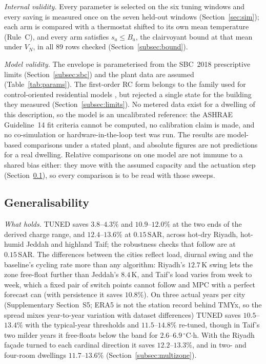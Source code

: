\documentclass[pdflatex,sn-mathphys-num,iicol]{sn-jnl}
\theoremstyle{thmstyleone}\newtheorem{proposition}{Proposition}\newtheorem{corollary}{Corollary}
\theoremstyle{thmstyletwo}\newtheorem{remark}{Remark}\newtheorem{observation}{Observation}
\theoremstyle{thmstylethree}\newtheorem{definition}{Definition}
\newcommand{\SAR}{\text{SAR}}
\begin{document}
\emph{Internal validity.} Every parameter is selected on the six tuning windows and every saving is measured once on the seven held-out windows (Section~\ref{sec:sim}); each arm is compared with a thermostat shifted to its own mean temperature (Rule~C), and every arm satisfies $s_a\le B_a$, the clairvoyant bound at that mean under $V_N$, in all $89$ rows checked (Section~\ref{subsec:bound}).

\emph{Model validity.} The envelope is parameterised from the SBC~2018 prescriptive limits (Section~\ref{subsec:sbc}) and the plant data are assumed (Table~\ref{tab:params}). The first-order RC form belongs to the family used for control-oriented residential models \citep{Wang2021RC,Shi2022}, but \citet{Bacher2011} rejected a single state for the building they measured (Section~\ref{subsec:limits}). No metered data exist for a dwelling of this description, so the model is an uncalibrated reference: the ASHRAE Guideline~14 fit criteria cannot be computed, no calibration claim is made, and no co-simulation or hardware-in-the-loop test was run. The results are model-based comparisons under a stated plant, and absolute figures are not predictions for a real dwelling. Relative comparisons on one model are not immune to a shared bias either: they move with the assumed capacity and the actuation step (Section~\ref{subsec:generalisability}), so every comparison is to be read with those sweeps.

\subsection{Generalisability}
\label{subsec:generalisability}

\emph{What holds.} TUNED saves $3.8$--$4.3\%$ and $10.9$--$12.0\%$ at the two ends of the derived charge range, and $12.4$--$13.6\%$ at $0.15\,\SAR$, across hot-dry Riyadh, hot-humid Jeddah and highland Taif; the robustness checks that follow are at $0.15\,\SAR$. The differences between the cities reflect load, diurnal swing and the baseline's cycling rate more than any algorithm: Riyadh's $12.7\,$K swing lets the zone free-float further than Jeddah's $8.4\,$K, and Taif's load varies from week to week, which a fixed pair of switch points cannot follow and MPC with a perfect forecast can (with persistence it saves $10.8\%$). On three actual years per city (Supplementary Section~S5; ERA5 is not the station record behind TMYx, so the spread mixes year-to-year variation with dataset differences) TUNED saves $10.5$--$13.4\%$ with the typical-year thresholds and $11.5$--$14.8\%$ re-tuned, though in Taif's two milder years it free-floats below the band for $2.6$--$6.9\,^\circ$C$\cdot$h. With the Riyadh façade turned to each cardinal direction it saves $12.2$--$13.3\%$, and in two- and four-room dwellings $11.7$--$13.6\%$ (Section~\ref{subsec:multizone}).
\end{document}
